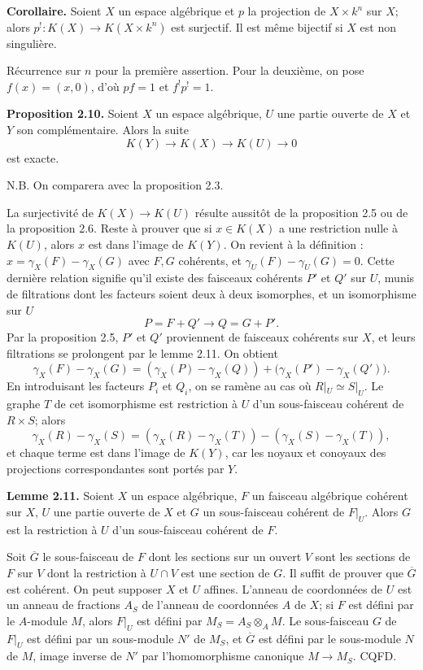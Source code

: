\documentclass[11pt]{article}
\begin{document}
\textbf{Corollaire.} Soient $X$ un espace algébrique et $p$ la projection de $X\times k^n$ sur $X$; alors $p^!:K(X)\to K(X\times k^n)$ est surjectif. Il est même bijectif si $X$ est non singulière.

Récurrence sur $n$ pour la première assertion. Pour la deuxième, on pose $f(x)=(x,0)$, d'où $pf=1$ et $f^!p^!=1$.

\textbf{Proposition 2.10.} Soient $X$ un espace algébrique, $U$ une partie ouverte de $X$ et $Y$ son complémentaire. Alors la suite
\begin{equation}\tag{2.30}
 K(Y)\longrightarrow K(X)\longrightarrow K(U)\longrightarrow 0
\end{equation}
est exacte.

N.B. On comparera avec la proposition 2.3.

La surjectivité de $K(X)\to K(U)$ résulte aussitôt de la proposition 2.5 ou de la proposition 2.6. Reste à prouver que si $x\in K(X)$ a une restriction nulle à $K(U)$, alors $x$ est dans l'image de $K(Y)$. On revient à la définition : $x=\gamma_X(F)-\gamma_X(G)$ avec $F,G$ cohérents, et $\gamma_U(F)-\gamma_U(G)=0$. Cette dernière relation signifie qu'il existe des faisceaux cohérents $P'$ et $Q'$ sur $U$, munis de filtrations dont les facteurs soient deux à deux isomorphes, et un isomorphisme sur $U$
\[
 P=F+Q'\longrightarrow Q=G+P'.
\]
Par la proposition 2.5, $P'$ et $Q'$ proviennent de faisceaux cohérents sur $X$, et leurs filtrations se prolongent par le lemme 2.11. On obtient
\[
 \gamma_X(F)-\gamma_X(G)=(\gamma_X(P)-\gamma_X(Q))+\bigl(\gamma_X(P')-\gamma_X(Q')\bigr).
\]
En introduisant les facteurs $P_i$ et $Q_i$, on se ramène au cas où $R|_U\simeq S|_U$. Le graphe $T$ de cet isomorphisme est restriction à $U$ d'un sous-faisceau cohérent de $R\times S$; alors
\[
 \gamma_X(R)-\gamma_X(S)=(\gamma_X(R)-\gamma_X(T))-(\gamma_X(S)-\gamma_X(T)),
\]
et chaque terme est dans l'image de $K(Y)$, car les noyaux et conoyaux des projections correspondantes sont portés par $Y$.

\textbf{Lemme 2.11.} Soient $X$ un espace algébrique, $F$ un faisceau algébrique cohérent sur $X$, $U$ une partie ouverte de $X$ et $G$ un sous-faisceau cohérent de $F|_U$. Alors $G$ est la restriction à $U$ d'un sous-faisceau cohérent de $F$.

Soit $\overline G$ le sous-faisceau de $F$ dont les sections sur un ouvert $V$ sont les sections de $F$ sur $V$ dont la restriction à $U\cap V$ est une section de $G$. Il suffit de prouver que $\overline G$ est cohérent. On peut supposer $X$ et $U$ affines. L'anneau de coordonnées de $U$ est un anneau de fractions $A_S$ de l'anneau de coordonnées $A$ de $X$; si $F$ est défini par le $A$-module $M$, alors $F|_U$ est défini par $M_S=A_S\otimes_AM$. Le sous-faisceau $G$ de $F|_U$ est défini par un sous-module $N'$ de $M_S$, et $\overline G$ est défini par le sous-module $N$ de $M$, image inverse de $N'$ par l'homomorphisme canonique $M\to M_S$. CQFD.
\end{document}
